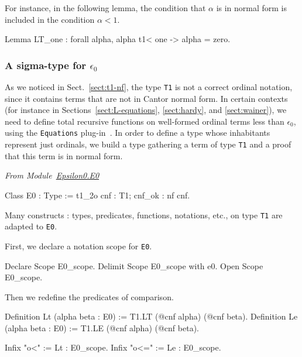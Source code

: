 \label{Predicates:LT-T1}
 

For instance, in the following lemma, the condition that $\alpha$ is in normal form is included in the condition $\alpha< 1$.

\begin{Coqsrc}
Lemma LT_one : forall alpha, alpha t1< one -> alpha = zero.
\end{Coqsrc}

  
\subsubsection{A sigma-type for \texorpdfstring{$\epsilon_0$}{epsilon0}}

As we noticed in Sect.~\ref{sect:t1-nf}, the type \texttt{T1} is not a correct ordinal notation, since it contains terms that are not in Cantor normal form. In certain contexts (for instance in Sections~\ref{sect:L-equations}, \ref{sect:hardy},
and \ref{sect:wainer}),  we need to define total recursive functions on well-formed ordinal terms less  than $\epsilon_0$, using the \texttt{Equations} plug-in~\cite{sozeau:hal-01671777}.
 In order to define a type whose inhabitants represent just ordinals, we build a type gathering a term of type \texttt{T1} and a proof that this term is in normal form.
 

\label{sect:E0-def}
\label{types:E0}

\emph{From Module~\href{../theories/html/hydras.Epsilon0.E0.html}{Epsilon0.E0}}



\begin{Coqsrc}
Class E0 : Type := t1_2o {cnf : T1; cnf_ok : nf cnf}.
\end{Coqsrc}

Many constructs : types, predicates, functions, notations, etc., on type \texttt{T1} are adapted to \texttt{E0}.

First, we declare a notation scope for \texttt{E0}.

\begin{Coqsrc}
Declare Scope E0_scope.
Delimit Scope E0_scope with e0.
Open Scope E0_scope.
\end{Coqsrc}

Then we redefine the predicates of comparison.

\label{Predicates:Lt-E0}

\begin{Coqsrc}
Definition Lt (alpha beta : E0) := T1.LT (@cnf alpha) (@cnf beta).
Definition Le (alpha beta : E0) := T1.LE (@cnf alpha) (@cnf beta).

Infix "o<" := Lt : E0_scope.
Infix "o<=" := Le : E0_scope.
\end{Coqsrc}
  

